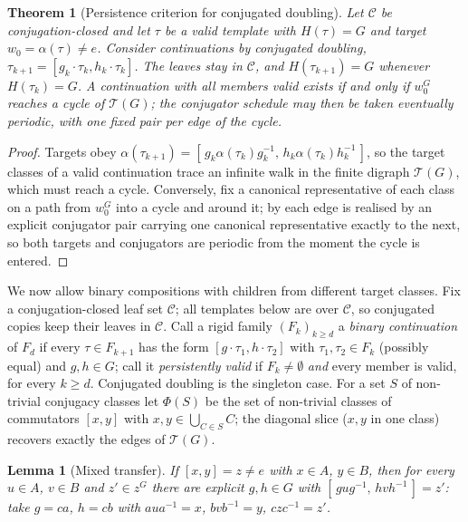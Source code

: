\documentclass[11pt]{amsart}
\newtheorem{theorem}{Theorem}[section]
\newtheorem{lemma}[lemma]{Lemma}
\theoremstyle{definition}
\theoremstyle{remark}
\theoremstyle{plain}
\theoremstyle{plain}
\numberwithin{equation}{section}
\begin{document}
\begin{theorem}[Persistence criterion for conjugated doubling]
\label{thm:persistence}
Let $\mathcal{C}$ be conjugation-closed and let $\tau$ be a valid template with $H(\tau)=G$ and
target $w_0=\alpha(\tau)\neq e$. Consider continuations by \emph{conjugated doubling},
$\tau_{k+1}=[g_k\cdot\tau_k,h_k\cdot\tau_k]$.
The leaves stay in $\mathcal{C}$, and $H(\tau_{k+1})=G$ whenever $H(\tau_k)=G$.
A continuation with all members valid exists if and only if $w_0^G$ reaches a cycle of
$\mathcal{T}(G)$; the conjugator schedule may then be taken eventually periodic, with one fixed
pair per edge of the cycle.
\end{theorem}
\begin{proof}
Targets obey $\alpha(\tau_{k+1})=[\,g_k\alpha(\tau_k)g_k^{-1},\,h_k\alpha(\tau_k)h_k^{-1}\,]$, so
the target classes of a valid continuation trace an infinite walk in the finite digraph
$\mathcal{T}(G)$, which must reach a cycle. Conversely, fix a canonical representative of each
class on a path from $w_0^G$ into a cycle and around it; by  each edge is
realised by an explicit conjugator pair carrying one canonical representative exactly to the
next, so both targets and conjugators are periodic from the moment the cycle is entered.
\end{proof}

We now allow binary compositions with children from different target classes. Fix a
conjugation-closed leaf set $\mathcal{C}$; all templates below are over $\mathcal{C}$, so
conjugated copies keep their leaves in $\mathcal{C}$. Call a rigid family
$(F_k)_{k\ge d}$ a \emph{binary continuation} of $F_d$ if every $\tau\in F_{k+1}$ has the form
$[g\cdot\tau_1,h\cdot\tau_2]$ with $\tau_1,\tau_2\in F_k$ (possibly equal) and $g,h\in
G$; call it \emph{persistently valid} if
$F_k\neq\emptyset$ \emph{and} every member is valid, for every $k\ge d$. Conjugated doubling is
the singleton case. For a set $S$ of non-trivial conjugacy classes let $\Phi(S)$ be the set of
non-trivial classes of commutators $[x,y]$ with $x,y\in\bigcup_{C\in S}C$; the diagonal slice
($x,y$ in one class) recovers exactly the edges of $\mathcal{T}(G)$.

\begin{lemma}[Mixed transfer]
\label{lem:mixedtransfer}
If $[x,y]=z\neq e$ with $x\in A$, $y\in B$, then for every $u\in A$, $v\in B$ and $z'\in z^G$
there are explicit $g,h\in G$ with $[\,gug^{-1},\,hvh^{-1}\,]=z'$: take $g=ca$, $h=cb$ with
$aua^{-1}=x$, $bvb^{-1}=y$, $czc^{-1}=z'$.
\end{lemma}
\end{document}

